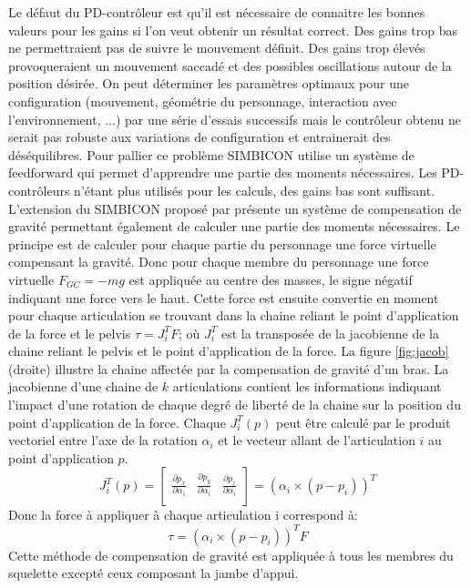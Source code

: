 \documentclass[runningheads,a4paper]{llncs}
\begin{document}
Le défaut du PD-contrôleur est qu'il est nécessaire de connaitre les bonnes valeurs pour les gains si l'on veut obtenir un résultat correct. Des gains trop bas ne permettraient pas de suivre le mouvement définit. Des gains trop élevés provoqueraient un mouvement saccadé et des possibles oscillations autour de la position désirée. On peut déterminer les paramètres optimaux pour une configuration (mouvement, géométrie du personnage, interaction avec l'environnement, ...) par une série d'essais successifs mais le contrôleur obtenu ne serait pas robuste aux variations de configuration et entrainerait des déséquilibres. Pour pallier ce problème SIMBICON utilise un système de feedforward \cite{yin2007simbicon} qui permet d'apprendre une partie des moments nécessaires. Les PD-contrôleurs n'étant plus utilisés pour les calculs, des gains bas sont suffisant. 
L'extension du SIMBICON proposé par \cite{coros2010generalized} présente un système de compensation de gravité permettant également de calculer une partie des moments nécessaires. Le principe est de calculer pour chaque partie du personnage une force virtuelle compensant la gravité. Donc pour chaque membre du personnage une force virtuelle \(F_{GC}=-mg\) est appliquée au centre des masses, le signe négatif indiquant une force vers le haut. Cette force est ensuite convertie en moment pour chaque articulation se trouvant dans la chaine reliant le point d'application de la force et le pelvis \(\tau=J_i^T F\); où \(J_i ^T\) est la transposée de la jacobienne de la chaine reliant le pelvis et le point d'application de la force. La figure \ref{fig:jacob} (droite) illustre la chaine affectée par la compensation de gravité d'un bras.
La jacobienne d'une chaine de \(k\) articulations contient les informations indiquant l'impact d'une rotation de chaque degré de liberté de la chaine sur la position du point d'application de la force. Chaque $J_i ^T(p)$ peut être calculé par le produit vectoriel entre l'axe de la rotation $\alpha_i$ et le vecteur allant de l'articulation \(i\) au point d'application $p$.
\[
J_i ^T (p)=\begin{bmatrix}
\frac{\partial p_x}{\partial \alpha_i} & \frac{\partial p_y}{\partial \alpha_i} & \frac{\partial p_z}{\partial \alpha_i} \\
\end{bmatrix}
= (\alpha_i \times (p-p_i))^T
\]
Donc la force à appliquer à chaque articulation i correspond à:
\[
\tau = (\alpha_i \times (p-p_i))^T F
\]
Cette méthode de compensation de gravité est appliquée à tous les membres du squelette excepté ceux composant la jambe d'appui.
\end{document}
